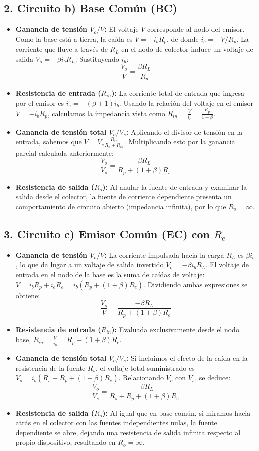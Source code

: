 \documentclass[12pt, a4paper]{article}
\begin{document}
\subsection*{2. Circuito b) Base Común (BC)}
\begin{itemize}
    \item \textbf{Ganancia de tensión $V_o/V$:} El voltaje $V$ corresponde al nodo del emisor. Como la base está a tierra, la caída es $V = -i_b R_p$, de donde $i_b = -V/R_p$. La corriente que fluye a través de $R_L$ en el nodo de colector induce un voltaje de salida $V_o = -\beta i_b R_L$. Sustituyendo $i_b$:
    \[ \frac{V_o}{V} = \frac{\beta R_L}{R_p} \]
    \item \textbf{Resistencia de entrada ($R_{in}$):} La corriente total de entrada que ingresa por el emisor es $i_e = -(\beta + 1)i_b$. Usando la relación del voltaje en el emisor $V = -i_b R_p$, calculamos la impedancia vista como $R_{in} = \frac{V}{i_e} = \frac{R_p}{1 + \beta}$.
    \item \textbf{Ganancia de tensión total $V_o/V_s$:} Aplicando el divisor de tensión en la entrada, sabemos que $V = V_s \frac{R_{in}}{R_s + R_{in}}$. Multiplicando esto por la ganancia parcial calculada anteriormente:
    \[ \frac{V_o}{V_s} = \frac{\beta R_L}{R_p + (1 + \beta)R_s} \]
    \item \textbf{Resistencia de salida ($R_o$):} Al anular la fuente de entrada y examinar la salida desde el colector, la fuente de corriente dependiente presenta un comportamiento de circuito abierto (impedancia infinita), por lo que $R_o = \infty$.
\end{itemize}

\subsection*{3. Circuito c) Emisor Común (EC) con $R_e$}
\begin{itemize}
    \item \textbf{Ganancia de tensión $V_o/V$:} La corriente impulsada hacia la carga $R_L$ es $\beta i_b$, lo que da lugar a un voltaje de salida invertido $V_o = -\beta i_b R_L$. El voltaje de entrada en el nodo de la base es la suma de caídas de voltaje: $V = i_b R_p + i_e R_e = i_b(R_p + (1 + \beta)R_e)$. Dividiendo ambas expresiones se obtiene:
    \[ \frac{V_o}{V} = \frac{-\beta R_L}{R_p + (1 + \beta)R_e} \]
    \item \textbf{Resistencia de entrada ($R_{in}$):} Evaluada exclusivamente desde el nodo base, $R_{in} = \frac{V}{i_b} = R_p + (1 + \beta)R_e$.
    \item \textbf{Ganancia de tensión total $V_o/V_s$:} Si incluimos el efecto de la caída en la resistencia de la fuente $R_s$, el voltaje total suministrado es $V_s = i_b(R_s + R_p + (1 + \beta)R_e)$. Relacionando $V_o$ con $V_s$, se deduce:
    \[ \frac{V_o}{V_s} = \frac{-\beta R_L}{R_s + R_p + (1 + \beta)R_e} \]
    \item \textbf{Resistencia de salida ($R_o$):} Al igual que en base común, si miramos hacia atrás en el colector con las fuentes independientes nulas, la fuente dependiente se abre, dejando una resistencia de salida infinita respecto al propio dispositivo, resultando en $R_o = \infty$.
\end{itemize}
\end{document}
